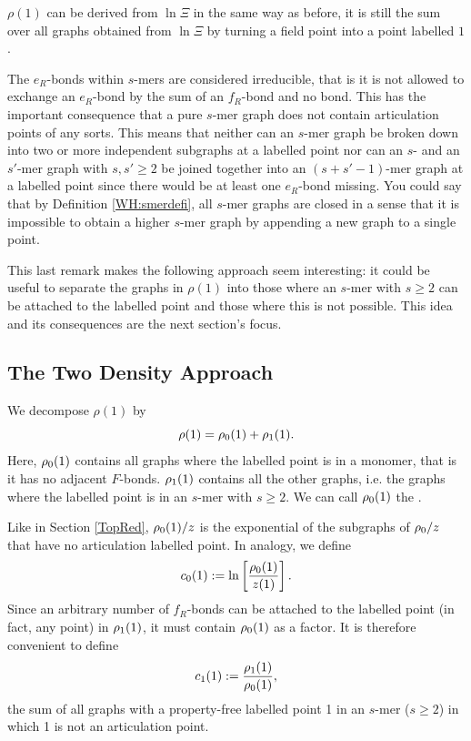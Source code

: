\documentclass[8.5pt,twoside,twocolumn]{article}
\newcommand\roz{\enmat{\rho_0}}
\newcommand\rone{\enmat{\rho_1}}
\theoremstyle{standard}
\begin{document}
$\rho(1)$ can be derived from $\ln\Xi$ in the same way as before, it is still the sum over all
graphs obtained from $\ln\Xi$ by turning a field point into a point labelled $1$.

The $e_R$-bonds within $s$-mers are considered irreducible, that is it is not allowed to exchange an
$e_R$-bond by the sum of an $f_R$-bond and no bond. This has the important consequence that a pure
$s$-mer graph does not contain articulation points of any sorts. This means that neither can an
$s$-mer graph be broken down into two or more independent subgraphs at a labelled point nor can
an $s$- and an $s'$-mer graph with $s,s' \ge 2$ be joined together into an $(s+s'-1)$-mer graph at
a labelled point since there would be at least one $e_R$-bond missing. You could say that
by Definition \ref{WH:smerdefi}, all $s$-mer graphs are closed in a sense that it is impossible
to obtain a higher $s$-mer graph by appending a new graph to a single point. 

This last remark makes the following approach seem interesting: it could be useful to separate
the graphs in $\rho(1)$ into those where an $s$-mer with $s\ge 2$ can be attached to the labelled
point and those where this is not possible. This idea and its consequences are the next section's
focus.
 
\subsection{The Two Density Approach}

We decompose $\rho(1)$ by
\begin{equation}
\rho(1)=\roz(1)+\rone(1).
\label{WH:rhoDecomp}
\end{equation}
Here, $\roz(1)$ contains all graphs where the labelled point is in a monomer, that
is it has no adjacent $F$-bonds. $\rone(1)$ contains all the other graphs, i.e.
the graphs where the labelled point is in an $s$-mer with $s\ge2$. We can call $\roz(1)$
the .

Like in Section \ref{TopRed}, $\roz(1)/z$ is the exponential of the subgraphs of $\roz/z$
that have no articulation labelled point. In analogy, we define
\begin{equation}
c_0(1):=\ln\lt[\frac{\roz(1)}{z(1)}\rt].
\label{WH:c0}
\end{equation}
Since an arbitrary number of $f_R$-bonds can be attached to the labelled point (in fact, any point)
in $\rone(1)$, it must contain $\roz(1)$ as a factor. It is therefore convenient to define
\begin{equation}
c_1(1):=\frac {\rone(1)}{\roz(1)},
\label{WH:c1}
\end{equation}
the sum of all graphs with a property-free labelled point 1 in an $s$-mer ($s\ge2$) in
which 1 is not an articulation point.
\end{document}
